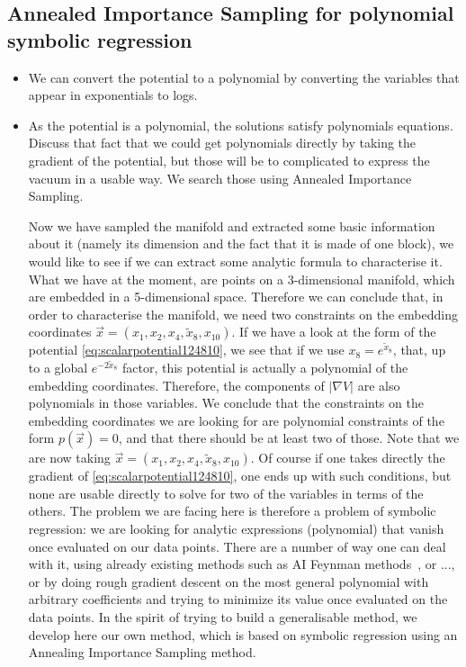 \documentclass[11pt]{article}
\begin{document}
	\subsection{Annealed Importance Sampling for polynomial symbolic regression}
	\begin{itemize}[label=\textbullet]
		\item We can convert the potential to a polynomial by converting the variables that appear in exponentials to logs.
		\item As the potential is a polynomial, the solutions satisfy polynomials equations. Discuss that fact that we could get polynomials directly by taking the gradient of the potential, but those will be to complicated to express the vacuum in a usable way.  We search those using Annealed Importance Sampling.
		
		Now we have sampled the manifold and extracted some basic information about it (namely its dimension and the fact that it is made of one block), we would like to see if we can extract some analytic formula to characterise it. What we have at the moment, are points on a 3-dimensional manifold, which are embedded in a 5-dimensional space. Therefore we can conclude that, in order to characterise the manifold, we need two constraints on the embedding coordinates $\vec{x} = (x_1,x_2,x_4,\tilde{x}_8,x_{10})$. If we have a look at the form of the potential \eqref{eq:scalarpotential124810}, we see that if we use $x_{8} = e^{\tilde{x}_8}$, that, up to a global $e^{-2\tilde{x}_8}$ factor, this potential is actually a polynomial of the embedding coordinates. Therefore, the components of $|\nabla V|$ are also polynomials in those variables. We conclude that the constraints on the embedding coordinates we are looking for are polynomial constraints of the form $p(\vec{x}) = 0$, and that there should be at least two of those. Note that we are now taking $\vec{x} = (x_1,x_2,x_4,\tilde{x}_8,x_{10})$. Of course if one takes directly the gradient of \eqref{eq:scalarpotential124810}, one ends up with such conditions, but none are usable directly to solve for two of the variables in terms of the others. The problem we are facing here is therefore a problem of symbolic regression: we are looking for analytic expressions (polynomial) that vanish once evaluated on our data points. There are a number of way one can deal with it, using already existing methods such as AI Feynman methods~\cite{Udrescu:2019mnk}, or ..., or by doing rough gradient descent on the most general polynomial with arbitrary coefficients and trying to minimize its value once evaluated on the data points. In the spirit of trying to build a generalisable method, we develop here our own method, which is based on symbolic regression using an Annealing Importance Sampling method. 


\end{itemize}
\end{document}
